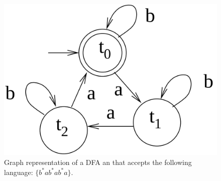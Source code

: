 \begin{figure}
\begin{center}
  \includegraphics[scale=0.17]{./images/CA_FDM/amod3Automata}
  \caption[Graph representation of a DFA.]{Graph representation of a DFA an that accepts the following language: $\{b^*ab^*ab^*a\}$.}
  \label{amod3Automata}
\end{center}
\end{figure}


